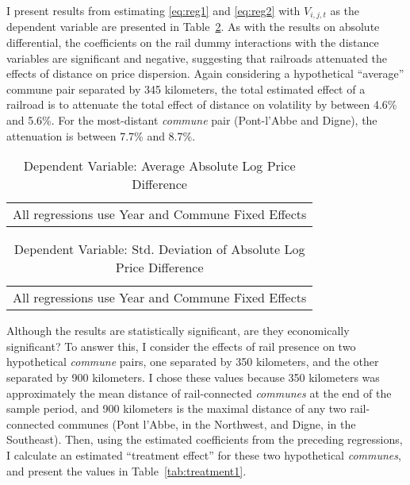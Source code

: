 \documentclass[12pt,twoside]{article}
\begin{document}
I present results from estimating \eqref{eq:reg1} and \eqref{eq:reg2} with $V_{i,j,t}$ as the dependent variable are presented in Table~\ref{tab:reg2}.
As with the results on absolute differential, the coefficients on the rail dummy interactions with the distance variables are significant and negative, suggesting that railroads attenuated the effects of distance on price dispersion.
Again considering a hypothetical ``average'' commune pair separated by 345 kilometers, the total estimated effect of a railroad is to attenuate the total effect of distance on volatility by between 4.6\% and 5.6\%.
For the most-distant \emph{commune} pair (Pont-l'Abbe and Digne), the attenuation is between 7.7\% and 8.7\%.

\begin{table}[htbp]\centering
\def\sym#1{\ifmmode^{#1}\else\(^{#1}\)\fi}
\caption{Dependent Variable: Average Absolute Log Price Difference\label{tab:reg1}}
\begin{tabular}{l*{4}{c}}
	\toprule
	
	\bottomrule
	\multicolumn{5}{l}{\footnotesize All regressions use Year and Commune Fixed Effects}\\
\end{tabular}
\end{table}

\begin{table}[htbp]\centering
\def\sym#1{\ifmmode^{#1}\else\(^{#1}\)\fi}
\caption{Dependent Variable: Std. Deviation of Absolute Log Price Difference\label{tab:reg2}}
	\begin{tabular}{l*{4}{c}}
	\toprule
	
	\bottomrule
	\multicolumn{5}{l}{\footnotesize All regressions use Year and Commune Fixed Effects}\\
	\end{tabular}
\end{table}

Although the results are statistically significant, are they economically significant?
To answer this, I consider the effects of rail presence on two hypothetical \emph{commune} pairs, one separated by 350 kilometers, and the other separated by 900 kilometers.
I chose these values because 350 kilometers was approximately the mean distance of rail-connected \emph{communes} at the end of the sample period, and 900 kilometers is the maximal distance of any two rail-connected communes (Pont l'Abbe, in the Northwest, and Digne, in the Southeast).
Then, using the estimated coefficients from the preceding regressions, I calculate an estimated ``treatment effect'' for these two hypothetical \emph{communes}, and present the values in Table~\ref{tab:treatment1}.
\end{document}
